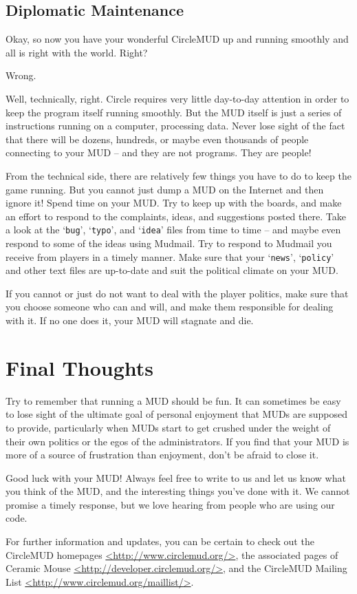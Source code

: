 \documentclass[11pt]{article}
\begin{document}
\subsection{Diplomatic Maintenance}
Okay, so now you have your wonderful CircleMUD up and running smoothly and all is right with the world.  Right?
\par
Wrong.
\par
Well, technically, right.  Circle requires very little day-to-day attention in order to keep the program itself running smoothly.  But the MUD itself is just a series of instructions running on a computer, processing data.  Never lose sight of the fact that there will be dozens, hundreds, or maybe even thousands of people connecting to your MUD -- and they are not programs.  They are people!
\par
From the technical side, there are relatively few things you have to do to keep the game running.  But you cannot just dump a MUD on the Internet and then ignore it!  Spend time on your MUD.  Try to keep up with the boards, and make an effort to respond to the complaints, ideas, and
suggestions posted there.  Take a look at the `\texttt{bug}', `\texttt{typo}', and `\texttt{idea}' files from time to time -- and maybe even respond to some of the ideas using Mudmail.  Try to respond to Mudmail you receive from players in a timely manner.  Make sure that your `\texttt{news}', `\texttt{policy}' and other text files are up-to-date and suit the political climate on your MUD.
\par
If you cannot or just do not want to deal with the player politics, make sure that you choose someone who can and will, and make them responsible for dealing with it.  If no one does it, your MUD will stagnate and die.

\section{Final Thoughts}
Try to remember that running a MUD should be fun.  It can sometimes be easy to lose sight of the ultimate goal of personal enjoyment that MUDs are supposed to provide, particularly when MUDs start to get crushed under the weight of their own politics or the egos of the administrators.  If you find that your MUD is more of a source of frustration than enjoyment, don't be afraid to close it.
\par
Good luck with your MUD!  Always feel free to write to us and let us know what you think of the MUD, and the interesting things you've done with it.  We cannot promise a timely response, but we love hearing from people who are using our code.
\par
For further information and updates, you can be certain to check out the CircleMUD homepages \url{<http://www.circlemud.org/>}, the associated pages of Ceramic Mouse \url{<http://developer.circlemud.org/>}, and the CircleMUD Mailing List \url{<http://www.circlemud.org/maillist/>}.
\end{document}
